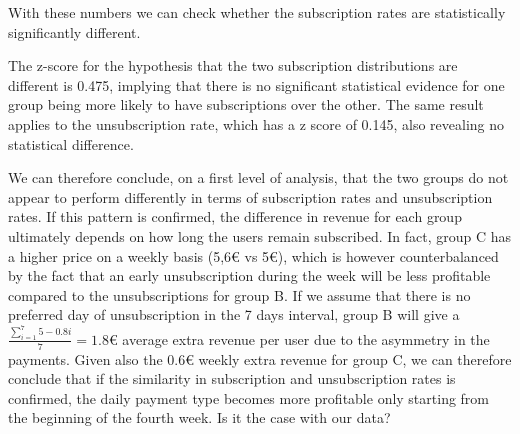 \documentclass[paper=a4, fontsize=10pt]{report}
\begin{document}
With these numbers we can check whether the subscription rates are statistically significantly different.

The z-score for the hypothesis that the two subscription distributions are different is 0.475, implying that there is no significant statistical evidence for one group being more likely to have
subscriptions over the other. The same result applies to the unsubscription rate, which has a z score of 0.145, also revealing no statistical difference.

We can therefore conclude, on a first level of analysis, that the two groups do not appear to perform differently in terms of subscription rates and unsubscription rates. If this 
pattern is confirmed, the difference in revenue for each group ultimately depends on how long the users remain subscribed. In fact, group C has a higher
price on a weekly basis (5,6€ vs 5€), which is
however counterbalanced by the fact that an early unsubscription during the week will be less profitable compared to the unsubscriptions for group B. 
If we assume that there is no preferred day of unsubscription in the 7 days interval, group B will give a $ \frac{\sum_{i=1}^{7} 5-0.8i}{7} =1.8$€ average
extra revenue per user due to the asymmetry in the payments. Given also the 0.6€ weekly extra revenue for group C, we can therefore conclude that if the similarity 
in subscription and
unsubscription rates is confirmed, the daily payment type becomes more profitable only starting from the beginning of the fourth week. 
Is it the case with our data?
\end{document}
